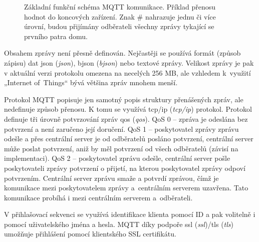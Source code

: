 \begin{figure}[H]
    \centering
    \def\svgwidth{\columnwidth}
    
    \caption[Základní funkční schéma MQTT komunikace.]{Základní funkční schéma MQTT komunikace. Příklad přenosu hodnot do koncových zařízení. Znak \# nahrazuje jednu či více úrovní, budou přijímány odběrateli všechny zprávy tykající se prvního patra domu.}
    \label{fig:mqtt-protokol}
\end{figure}

Obsahem zprávy není přesně definován. Nejčastěji se používá formát (způsob zápisu) dat \acrshort{json} (\textit{\acrlong{json}}), \acrshort{bjson} (\textit{\acrlong{bjson}}) nebo textové zprávy. Velikost zprávy je pak v aktuální verzi protokolu omezena na necelých 256 MB, ale vzhledem k~využití „Internet of~Things“ bývá většina zpráv mnohem menší. \cite{vojacek-mqtt}

Protokol MQTT popisuje jen samotný popis struktury přenášených zpráv, ale nedefinuje způsob přenosu. K tomu se využívá \acrshort{tcp/ip} (\textit{\acrlong{tcp/ip}}) protokol. Protokol definuje tři úrovně potvrzování zpráv \acrshort{qos} (\textit{\acrlong{qos}}). QoS 0 – zpráva je odeslána bez potvrzení a není zaručeno její doručení. QoS 1 – poskytovatel zprávy zprávu odešle a přes centrální server je od odběratelů posláno potvrzení, centrální server může poslat potvrzení, aniž by měl potvrzení od všech odběratelů (závisí na implementaci). QoS 2 – poskytovatel zprávu odešle, centrální server pošle poskytovateli zprávy potvrzení o přijetí, na kterou poskytovatel zprávy odpoví potvrzením. Centrální server zprávu smaže a potvrdí zprávou, čímž je komunikace mezi poskytovatelem zprávy a~centrálním serverem uzavřena. Tato komunikace probíhá i mezi centrálním serverem a~odběrateli. \cite{maly-mqtt}


V přihlašovací sekvenci se využívá identifikace klienta pomocí ID a pak volitelně i pomocí uživatelského jména a hesla. MQTT díky podpoře \acrshort{ssl} (\textit{\acrlong{ssl}})/\acrshort{tls} (\textit{\acrlong{tls}}) umožňuje přihlášení pomocí klientského SSL certifikátu. \cite{vojacek-mqtt}
\setnowidow[2]
